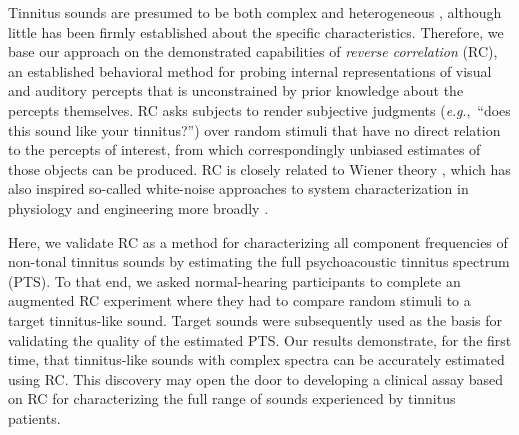 \documentclass[journal]{IEEEtran}
\newcommand{\eg}{\textit{e}.\textit{g}.,\ }
\begin{document}
Tinnitus sounds are presumed to be both complex and heterogeneous
\cite{vajsakovicPrinciplesMethodsPsychoacoustic2021,henryTinnitusEpidemiologicPerspective2020,meikleTinnitusArchiveArchive2004},
although little has been firmly established about the specific characteristics.
Therefore, we base our approach on the demonstrated capabilities of \textit{reverse correlation} (RC),
an established behavioral method
\cite{ahumadaStimulusFeaturesSignal1971,gosselinSuperstitiousPerceptionsReveal2003,brimijoinInternalRepresentationVowel2013}
for probing internal representations of visual and auditory percepts that is unconstrained by prior knowledge about the percepts themselves.
RC asks subjects to render subjective judgments (\eg “does this sound like your tinnitus?”)
over random stimuli that have no direct relation to the percepts of interest,
from which correspondingly unbiased estimates of those objects can be produced.
RC is closely related to Wiener theory \cite{wienerNonlinearProblemsRandom1966},
which has also inspired so-called white-noise approaches to system characterization in physiology
\cite{ringachReverseCorrelationNeurophysiology2004,marmarelisWhiteNoiseMethodSystem1978} and engineering more broadly
\cite{ljungMeasureLackFit1978}.

Here, we validate RC as a method for characterizing all component
frequencies of non-tonal tinnitus sounds
by estimating the full psychoacoustic tinnitus spectrum (PTS).
To that end, we asked normal-hearing participants to complete an augmented RC experiment where they had to compare random stimuli to a target tinnitus-like sound.
Target sounds were subsequently used as the basis for validating the quality of the estimated PTS.
Our results demonstrate, for the first time, that tinnitus-like sounds with complex spectra can be accurately estimated using RC. 
This discovery may open the door to developing a clinical assay based on RC for characterizing the full range of sounds experienced by tinnitus patients.

\end{document}
